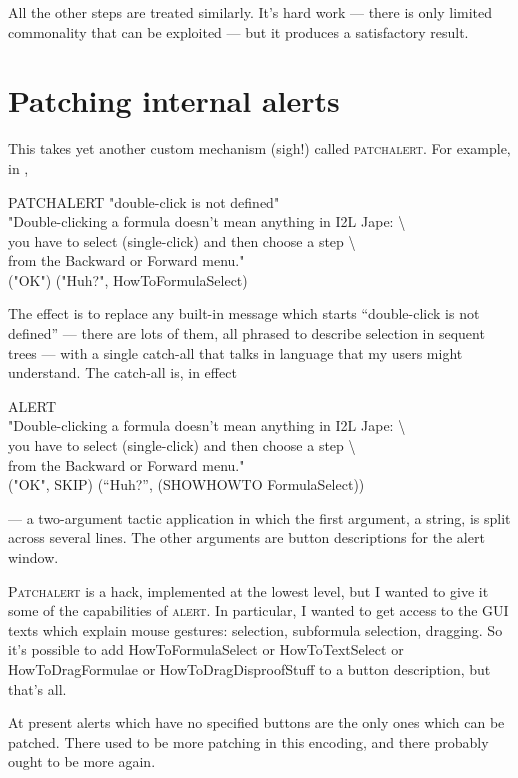 All the other steps are treated similarly. It's hard work --- there is only limited commonality that can be exploited --- but it produces a satisfactory result.

\section{Patching internal alerts}

This takes yet another custom mechanism (sigh!) called \textsc{patchalert}. For example, in ,
\begin{japeish}
PATCHALERT "double-click is not defined" \\
\tab "Double-clicking a formula doesn't mean anything in I2L Jape: {\textbackslash} \\
\tab {\textbackslash}you have to select (single-click) and then choose a step {\textbackslash} \\
\tab {\textbackslash}from the Backward or Forward menu." \\
\tab ("OK") ("Huh?", HowToFormulaSelect)
\end{japeish}
The effect is to replace any built-in message which starts ``double-click is not defined'' --- there are lots of them, all phrased to describe selection in sequent trees --- with a single catch-all that talks in language that my users might understand. The catch-all is, in effect 
\begin{japeish}
ALERT \\
\tab "Double-clicking a formula doesn't mean anything in I2L Jape: {\textbackslash} \\
\tab {\textbackslash}you have to select (single-click) and then choose a step {\textbackslash} \\
\tab {\textbackslash}from the Backward or Forward menu." \\
\tab ("OK", SKIP) (``Huh?'', (SHOWHOWTO FormulaSelect))
\end{japeish}
--- a two-argument tactic application in which the first argument, a string, is split across several lines. The other arguments are button descriptions for the alert window.

\textsc{Patchalert} is a hack, implemented at the lowest level, but I wanted to give it some of the capabilities of \textsc{alert}. In particular, I wanted to get access to the GUI texts which explain mouse gestures: selection, subformula selection, dragging. So it's possible to add HowToFormulaSelect or HowToTextSelect or HowToDragFormulae or HowToDragDisproofStuff to a button description, but that's all.

At present alerts which have no specified buttons are the only ones which can be patched. There used to be more patching in this encoding, and there probably ought to be more again.